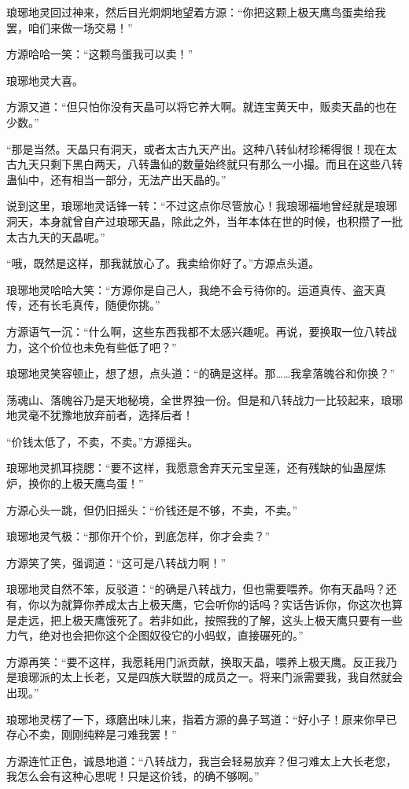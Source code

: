 \begin{this_body}
琅琊地灵回过神来，然后目光炯炯地望着方源：“你把这颗上极天鹰鸟蛋卖给我罢，咱们来做一场交易！”

方源哈哈一笑：“这颗鸟蛋我可以卖！”

琅琊地灵大喜。

方源又道：“但只怕你没有天晶可以将它养大啊。就连宝黄天中，贩卖天晶的也在少数。”

“那是当然。天晶只有洞天，或者太古九天产出。这种八转仙材珍稀得很！现在太古九天只剩下黑白两天，八转蛊仙的数量始终就只有那么一小撮。而且在这些八转蛊仙中，还有相当一部分，无法产出天晶的。”

说到这里，琅琊地灵话锋一转：“不过这点你尽管放心！我琅琊福地曾经就是琅琊洞天，本身就曾自产过琅琊天晶，除此之外，当年本体在世的时候，也积攒了一批太古九天的天晶呢。”

“哦，既然是这样，那我就放心了。我卖给你好了。”方源点头道。

琅琊地灵哈哈大笑：“方源你是自己人，我绝不会亏待你的。运道真传、盗天真传，还有长毛真传，随便你挑。”

方源语气一沉：“什么啊，这些东西我都不太感兴趣呢。再说，要换取一位八转战力，这个价位也未免有些低了吧？”

琅琊地灵笑容顿止，想了想，点头道：“的确是这样。那……我拿落魄谷和你换？”

荡魂山、落魄谷乃是天地秘境，全世界独一份。但是和八转战力一比较起来，琅琊地灵毫不犹豫地放弃前者，选择后者！

“价钱太低了，不卖，不卖。”方源摇头。

琅琊地灵抓耳挠腮：“要不这样，我愿意舍弃天元宝皇莲，还有残缺的仙蛊屋炼炉，换你的上极天鹰鸟蛋！”

方源心头一跳，但仍旧摇头：“价钱还是不够，不卖，不卖。”

琅琊地灵气极：“那你开个价，到底怎样，你才会卖？”

方源笑了笑，强调道：“这可是八转战力啊！”

琅琊地灵自然不笨，反驳道：“的确是八转战力，但也需要喂养。你有天晶吗？还有，你以为就算你养成太古上极天鹰，它会听你的话吗？实话告诉你，你这次也算是走远，把上极天鹰饿死了。若非如此，按照我的了解，这头上极天鹰只要有一些力气，绝对也会把你这个企图奴役它的小蚂蚁，直接碾死的。”

方源再笑：“要不这样，我愿耗用门派贡献，换取天晶，喂养上极天鹰。反正我乃是琅琊派的太上长老，又是四族大联盟的成员之一。将来门派需要我，我自然就会出现。”

琅琊地灵楞了一下，琢磨出味儿来，指着方源的鼻子骂道：“好小子！原来你早已存心不卖，刚刚纯粹是刁难我罢！”

方源连忙正色，诚恳地道：“八转战力，我岂会轻易放弃？但刁难太上大长老您，我怎么会有这种心思呢！只是这价钱，的确不够啊。”


\end{this_body}
